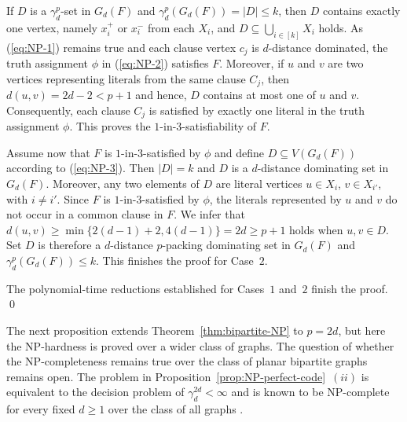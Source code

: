 \documentclass[12pt]{article}
\begin{document}
\begin{description}
If $D$ is a $\gamma_d^p$-set in $G_d(F)$ and $\gamma_d^p(G_d(F))= |D| \leq k$, then $D$ contains exactly one vertex, namely $x_i^+$ or $x_i^-$ from each $X_i$,  and $D \subseteq \bigcup_{i \in [k]} X_i$ holds. As (\ref{eq:NP-1}) remains true and each clause vertex $c_j$ is $d$-distance dominated, the truth assignment $\phi$ in (\ref{eq:NP-2}) satisfies $F$. Moreover, if $u$ and $v$ are two vertices representing literals from the same clause $C_j$, then $d(u,v)= 2d-2 < p+1$ and hence, $D$ contains at most one of $u$ and $v$. Consequently, each clause $C_j$ is satisfied by exactly one literal in the truth assignment $\phi$. This proves the $1$-in-$3$-satisfiability of $F$.

Assume now that $F$ is $1$-in-$3$-satisfied by $\phi$ and define $D \subseteq V(G_d(F))$ according to (\ref{eq:NP-3}). Then $|D|=k$ and $D$ is a $d$-distance dominating set in $G_d(F)$. Moreover, any two elements of $D$ are literal vertices $u \in X_i$, $v \in X_{i'}$, with $i \neq i'$. Since $F$ is $1$-in-$3$-satisfied by $\phi$, the literals represented by $u$ and $v$ do not occur in a common clause in $F$.
We infer that $d(u,v) \ge \min\{2(d-1)+2, 4(d-1)\} =2d \ge p+1$ holds when $u,v \in D$. Set $D$ is therefore a $d$-distance $p$-packing dominating set in $G_d(F)$ and $\gamma_d^p(G_d(F)) \leq k$. This finishes the proof for Case~$2$.
\end{description}

The polynomial-time reductions established for Cases~$1$ and~$2$ finish the proof.
\qed

\medskip
The next proposition extends Theorem~\ref{thm:bipartite-NP} to $p=2d$, but here the NP-hardness is proved over a wider class of graphs. The question of whether the NP-completeness remains true over the class of planar bipartite graphs remains open. The problem in Proposition~\ref{prop:NP-perfect-code}~$(ii)$ is equivalent to the decision problem of $\gamma_d^{2d} <\infty$ and is known to be NP-complete for every fixed $d\ge 1$ over the class of all graphs \cite{Kratochvil-book}.
\end{document}
